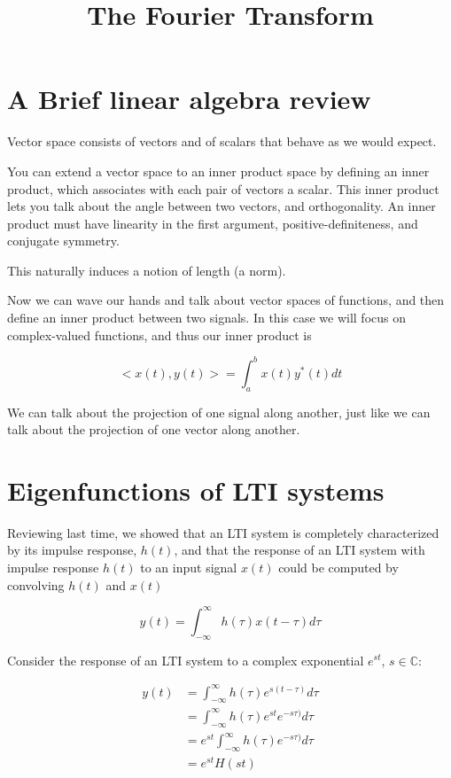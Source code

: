 

\title{The Fourier Transform}

\maketitle

\listoffixmes


\section{A Brief linear algebra review}
Vector space consists of vectors and of scalars that behave as we
would expect.

You can extend a vector space to an inner product space by defining an 
inner product, which associates with each pair of vectors a scalar. This
inner product lets you talk about the angle between two vectors,
and orthogonality. An inner product must have linearity in the first
argument, positive-definiteness, and conjugate symmetry. 

This naturally induces a notion of length (a norm). 

Now we can wave our hands and talk about vector spaces of functions, 
and then define an inner product between two signals. In this case
we will focus on complex-valued functions, and thus our inner product is

\[
<x(t), y(t)> = \int_a^b x(t) y^*(t) dt
\]

We can talk about the projection of one signal along another, just
like we can talk about the projection of one vector along another.


\section{Eigenfunctions of LTI systems}
Reviewing last time, we showed that an LTI system is completely
characterized by its impulse response, $h(t)$, and that the
response of an LTI system with impulse response $h(t)$ to an
input signal $x(t)$ could be computed by convolving $h(t)$ and $x(t)$

\[
y(t) = \int_{-\infty}^{\infty}h(\tau) x(t-\tau) d\tau
\]

Consider the response of an LTI system to a complex exponential $e^{st}$, 
$s \in \mathbb{C}$:

\begin{align}
y(t) &=  \int_{-\infty}^{\infty}h(\tau) e^{s(t-\tau)} d\tau \\
     &=  \int_{-\infty}^{\infty}h(\tau) e^{st}e^{-s\tau)} d\tau \\
     &=  e^{st}\int_{-\infty}^{\infty}h(\tau) e^{-s\tau)} d\tau \\
     &= e^{st}H(st)\\
\end{align}

